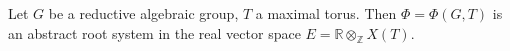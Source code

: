Let $G$ be a reductive algebraic group, $T$ a maximal torus. Then $\Phi = \Phi(G, T)$ is an abstract root system in the real vector space $E = \mathbb{R} \otimes_{\mathbb{Z}} X(T)$.
